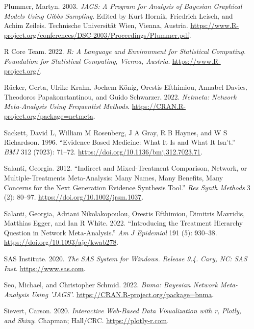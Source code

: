 \begin{CSLReferences}{1}{0}
\leavevmode{}%
Plummer, Martyn. 2003. \emph{JAGS: A Program for Analysis of Bayesian Graphical Models Using Gibbs Sampling}. Edited by Kurt Hornik, Friedrich Leisch, and Achim Zeileis. Technische Universität Wien, Vienna, Austria. \url{https://www.R-project.org/conferences/DSC-2003/Proceedings/Plummer.pdf}.

\leavevmode{}%
R Core Team. 2022. \emph{{R: A Language and Environment for Statistical Computing}. Foundation for Statistical Computing, Vienna, Austria}. \url{https://www.R-project.org/}.

\leavevmode{}%
Rücker, Gerta, Ulrike Krahn, Jochem König, Orestis Efthimiou, Annabel Davies, Theodoros Papakonstantinou, and Guido Schwarzer. 2022. \emph{Netmeta: Network Meta-Analysis Using Frequentist Methods}. \url{https://CRAN.R-project.org/package=netmeta}.

\leavevmode{}%
Sackett, David L, William M Rosenberg, J A Gray, R B Haynes, and W S Richardson. 1996. {``Evidence Based Medicine: What It Is and What It Isn't.''} \emph{BMJ} 312 (7023): 71--72. \url{https://doi.org/10.1136/bmj.312.7023.71}.

\leavevmode{}%
Salanti, Georgia. 2012. {``Indirect and Mixed-Treatment Comparison, Network, or Multiple-Treatments Meta-Analysis: Many Names, Many Benefits, Many Concerns for the Next Generation Evidence Synthesis Tool.''} \emph{Res Synth Methods} 3 (2): 80--97. \url{https://doi.org/10.1002/jrsm.1037}.

\leavevmode{}%
Salanti, Georgia, Adriani Nikolakopoulou, Orestis Efthimiou, Dimitris Mavridis, Matthias Egger, and Ian R White. 2022. {``Introducing the Treatment Hierarchy Question in Network Meta-Analysis.''} \emph{Am J Epidemiol} 191 (5): 930--38. \url{https://doi.org/10.1093/aje/kwab278}.

\leavevmode{}%
SAS Institute. 2020. \emph{{The SAS System for Windows}. Release 9.4. Cary, NC: SAS Inst}. \url{https://www.sas.com}.

\leavevmode{}%
Seo, Michael, and Christopher Schmid. 2022. \emph{Bnma: Bayesian Network Meta-Analysis Using 'JAGS'}. \url{https://CRAN.R-project.org/package=bnma}.

\leavevmode{}%
Sievert, Carson. 2020. \emph{{Interactive Web-Based Data Visualizatio}n with r, Plotly, and Shiny}. Chapman; Hall/CRC. \url{https://plotly-r.com}.


\end{CSLReferences}
